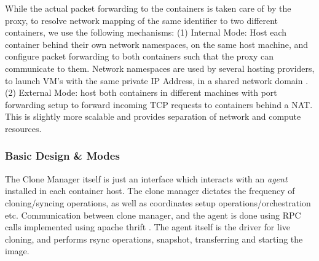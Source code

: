 While the actual packet forwarding to the containers is taken care of by the proxy, to resolve network mapping of the same identifier to two different containers, we use the following mechanisms: 
(1) Internal Mode: Host each container behind their own network namespaces, on the same host machine, and configure packet forwarding to both containers such that the proxy can communicate to them. 
Network namespaces are used by several hosting providers, to launch VM's with the same private IP Address, in a shared network domain \cite{OpenStack}. 
(2) External Mode: host both containers in different machines with port forwarding setup to forward incoming TCP requests to containers behind a NAT. 
This is slightly more scalable and provides separation of network and compute resources. 

\iffalse
\subsubsection{Basic Design \& Modes}

The Clone Manager itself is just an interface which interacts with an \textit{agent} installed in each container host.
The clone manager dictates the frequency of cloning/syncing operations, as well as  coordinates setup operations/orchestration etc.
Communication between clone manager, and the agent is done using RPC calls implemented using apache thrift \cite{thrift}.
The agent itself is the driver for live cloning, and performs rsync operations, snapshot, transferring and starting the image.

